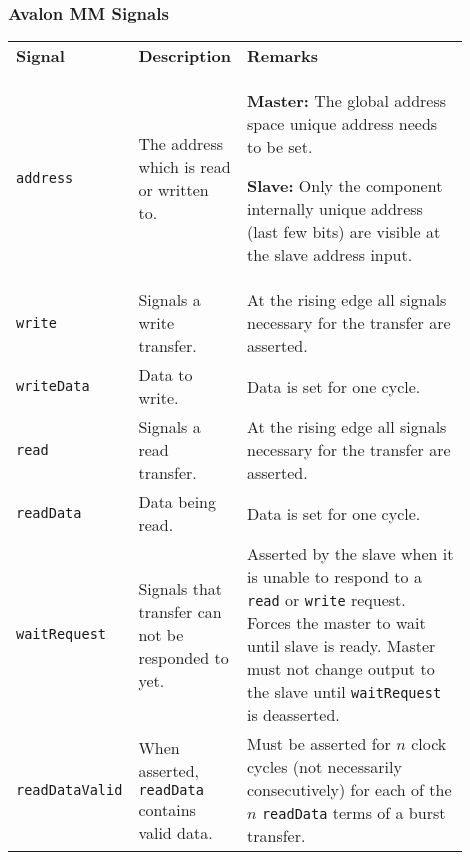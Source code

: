 		\subsubsection{Avalon MM Signals  }
			\begin{longtable}{|p{0.12\linewidth}||p{0.22\linewidth}|p{0.56\linewidth}|}					
				\hline
				\textbf{Signal}
					& \textbf{Description}
					& \textbf{Remarks}\\
				\hhline{|=#=|=|}
				\texttt{address}
					& The address which is read or written to. 
					&   \textbf{Master:} The global address space unique address needs to be set.
					
					  	\textbf{Slave:} Only the component internally unique address (last few bits) are visible at the slave address input.\\
				\hline
				\texttt{write}
					& Signals a write transfer.
					& At the rising edge all signals necessary for the transfer are asserted.\\
				\hline
				\texttt{writeData}
					& Data to write.
					& Data is set for one cycle.\\
				\hline
				\texttt{read}
					& Signals a read transfer.
					& At the rising edge all signals necessary for the transfer are asserted.\\
				\hline
				\texttt{readData}
					& Data being read.
					& Data is set for one cycle.\\
				\hline
				\texttt{waitRequest}
					& Signals that transfer can not be responded to yet.
					& Asserted by the slave when it is unable to respond to a \texttt{read} or \texttt{write} request. Forces the master to wait until slave is ready. Master must not change output to the slave until \texttt{waitRequest} is deasserted.\\
				\hline
				\texttt{readDataValid}
					& When asserted, \texttt{readData} contains valid data.
					& Must be asserted for $n$ clock cycles (not necessarily consecutively) for each of the $n$ \texttt{readData} terms of a burst transfer.\\
				\hline
			\end{longtable}
		
